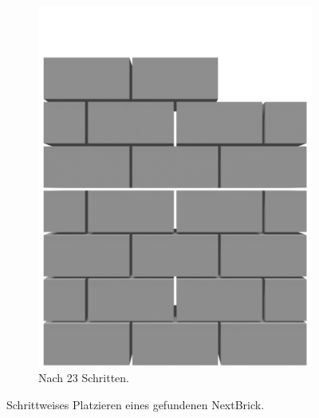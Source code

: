 \begin{figure}[htb]
\begin{subfigure}[b]{0.3\columnwidth}
    \includegraphics[width=\columnwidth]{fig/scenario4_output_23_render.png}
    \caption{Nach 23 Schritten.}
  \end{subfigure}
  \caption{Schrittweises Platzieren eines gefundenen NextBrick.}\label{fig:poc:result_scenario4}
\end{figure}
